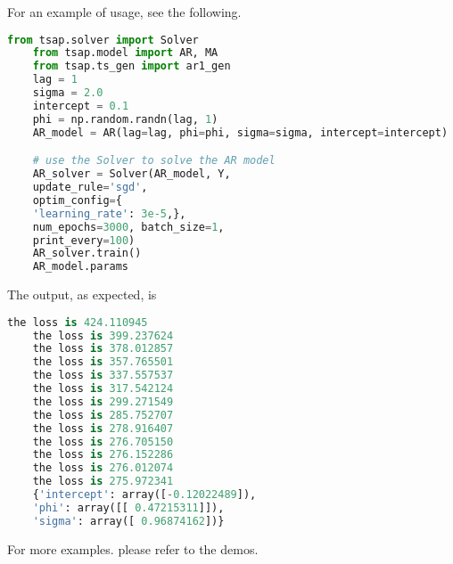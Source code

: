 For an example of usage, see the following. 
   \begin{lstlisting}[language=Python]
	from tsap.solver import Solver
	from tsap.model import AR, MA
	from tsap.ts_gen import ar1_gen
	lag = 1
	sigma = 2.0
	intercept = 0.1
	phi = np.random.randn(lag, 1)
	AR_model = AR(lag=lag, phi=phi, sigma=sigma, intercept=intercept)

	# use the Solver to solve the AR model
	AR_solver = Solver(AR_model, Y,
	update_rule='sgd',
	optim_config={
	'learning_rate': 3e-5,},
	num_epochs=3000, batch_size=1,
	print_every=100)
	AR_solver.train()
	AR_model.params
\end{lstlisting}
The output, as expected, is
   \begin{lstlisting}[language=Python]
	the loss is 424.110945
	the loss is 399.237624
	the loss is 378.012857
	the loss is 357.765501
	the loss is 337.557537
	the loss is 317.542124
	the loss is 299.271549
	the loss is 285.752707
	the loss is 278.916407
	the loss is 276.705150
	the loss is 276.152286
	the loss is 276.012074
	the loss is 275.972341
	{'intercept': array([-0.12022489]),
	'phi': array([[ 0.47215311]]),
	'sigma': array([ 0.96874162])}
\end{lstlisting}
For more examples. please refer to the demos.